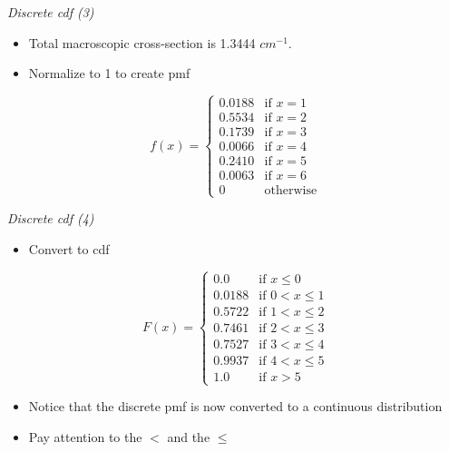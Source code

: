 \emph{Discrete cdf (3)}
  \begin{itemize}
    \item Total macroscopic cross-section is 1.3444 $cm^{-1}$.
    \item Normalize to 1 to create pmf
  \end{itemize}
     \begin{displaymath}
        f(x) = \left\{ \begin{array}{ll}
                         0.0188 & \textrm{if $x = 1$}\\                       
                         0.5534 & \textrm{if $x = 2$}\\
                         0.1739 & \textrm{if $x = 3$}\\
                         0.0066 & \textrm{if $x = 4$}\\
                         0.2410 & \textrm{if $x = 5$}\\
                         0.0063 & \textrm{if $x = 6$}\\
                         0 & \textrm{otherwise}
                       \end{array} \right.
     \end{displaymath}


\emph{Discrete cdf (4)}
  \begin{itemize}
    \item Convert to cdf 
  \end{itemize}
     \begin{displaymath}
        F(x) = \left\{ \begin{array}{ll}
                         0.0    & \textrm{if $x \le 0$}\\                       
                         0.0188 & \textrm{if $0 < x \le 1$}\\
                         0.5722 & \textrm{if $1 < x \le 2$}\\
                         0.7461 & \textrm{if $2 < x \le 3$}\\
                         0.7527 & \textrm{if $3 < x \le 4$}\\
                         0.9937 & \textrm{if $4 < x \le 5$}\\
                         1.0 & \textrm{if $x > 5$}
                       \end{array} \right.
     \end{displaymath}
  \begin{itemize}
    \item Notice that the discrete pmf is now converted to a continuous distribution
    \item Pay attention to the $<$ and the $\le$  
  \end{itemize}



